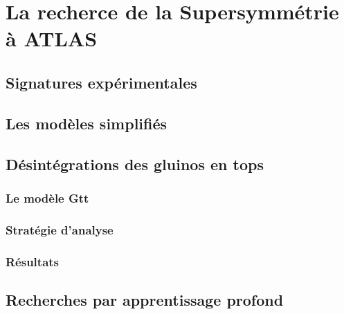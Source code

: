 \singlespacing{}
\section{La recherce de la Supersymmétrie à ATLAS}
\label{sec:susy_atlas}
\doublespacing{}

\subsection{Signatures expérimentales}
\label{sec:susy_atlas:signatures}

\subsection{Les modèles simplifiés}
\label{sec:susy_atlas:modele_simple}

\subsection{Désintégrations des gluinos en tops}
\label{sec:susy_atlas:gtt}

\subsubsection{Le modèle Gtt}
\label{sec:susy_atlas:gtt:gtt}

\subsubsection{Stratégie d'analyse}
\label{sec:susy_atlas:gtt:strategie}

\subsubsection{Résultats}
\label{sec:susy_atlas:gtt:resultats}

\subsection{Recherches par apprentissage profond}
\label{sec:susy_atlas:ml}
